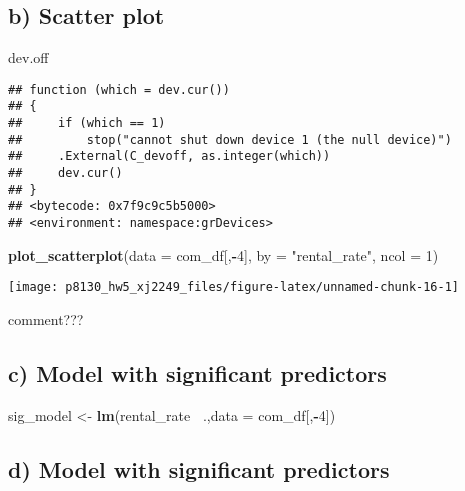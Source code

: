 \documentclass[]{article}
\newenvironment{Shaded}{\begin{snugshade}}{\end{snugshade}}
\newcommand{\DataTypeTok}[1]{\textcolor[rgb]{0.13,0.29,0.53}{#1}}
\newcommand{\DecValTok}[1]{\textcolor[rgb]{0.00,0.00,0.81}{#1}}
\newcommand{\KeywordTok}[1]{\textcolor[rgb]{0.13,0.29,0.53}{\textbf{#1}}}
\newcommand{\NormalTok}[1]{#1}
\newcommand{\OperatorTok}[1]{\textcolor[rgb]{0.81,0.36,0.00}{\textbf{#1}}}
\newcommand{\StringTok}[1]{\textcolor[rgb]{0.31,0.60,0.02}{#1}}
\begin{document}
\hypertarget{b-scatter-plot}{%
\subsection{b) Scatter plot}\label{b-scatter-plot}}

\begin{Shaded}
\begin{Highlighting}[]
\NormalTok{dev.off}
\end{Highlighting}
\end{Shaded}

\begin{verbatim}
## function (which = dev.cur()) 
## {
##     if (which == 1) 
##         stop("cannot shut down device 1 (the null device)")
##     .External(C_devoff, as.integer(which))
##     dev.cur()
## }
## <bytecode: 0x7f9c9c5b5000>
## <environment: namespace:grDevices>
\end{verbatim}

\begin{Shaded}
\begin{Highlighting}[]
\KeywordTok{plot_scatterplot}\NormalTok{(}\DataTypeTok{data =}\NormalTok{ com_df[,}\OperatorTok{-}\DecValTok{4}\NormalTok{], }\DataTypeTok{by =} \StringTok{"rental_rate"}\NormalTok{, }\DataTypeTok{ncol =} \DecValTok{1}\NormalTok{)}
\end{Highlighting}
\end{Shaded}

\texttt{[image: p8130\_hw5\_xj2249\_files/figure-latex/unnamed-chunk-16-1]}

comment???

\hypertarget{c-model-with-significant-predictors}{%
\subsection{c) Model with significant
predictors}\label{c-model-with-significant-predictors}}

\begin{Shaded}
\begin{Highlighting}[]
\NormalTok{sig_model <-}\StringTok{ }\KeywordTok{lm}\NormalTok{(rental_rate }\OperatorTok{~}\NormalTok{.,}\DataTypeTok{data =}\NormalTok{  com_df[,}\OperatorTok{-}\DecValTok{4}\NormalTok{])}
\end{Highlighting}
\end{Shaded}

\hypertarget{d-model-with-significant-predictors}{%
\subsection{d) Model with significant
predictors}\label{d-model-with-significant-predictors}}
\end{document}
